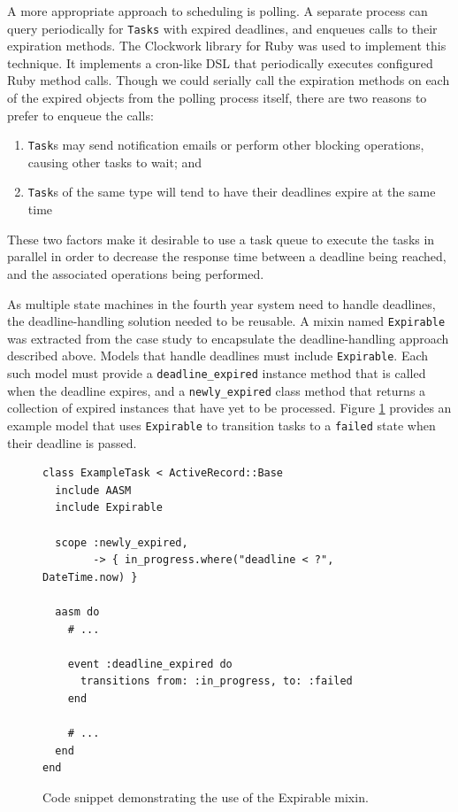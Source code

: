 \documentclass[document.tex]{subfiles}
\begin{document}
A more appropriate approach to scheduling is polling. A separate process can query periodically for \verb!Tasks! with expired deadlines, and enqueues calls to their expiration methods. The Clockwork \cite{clockwork} library for Ruby was used to implement this technique. It implements a cron-like DSL that periodically executes configured Ruby method calls. Though we could serially call the expiration methods on each of the expired objects from the polling process itself, there are two reasons to prefer to enqueue the calls:
\begin{enumerate}
\item \verb!Task!s may send notification emails or perform other blocking operations, causing other tasks to wait; and
\item \verb!Task!s of the same type will tend to have their deadlines expire at the same time
\end{enumerate}
These two factors make it desirable to use a task queue to execute the tasks in parallel in order to decrease the response time between a deadline being reached, and the associated operations being performed.

As multiple state machines in the fourth year system need to handle deadlines, the deadline-handling solution needed to be reusable. A mixin named \verb!Expirable! was extracted from the case study to encapsulate the deadline-handling approach described above. Models that handle deadlines must include \verb!Expirable!. Each such model must provide a \verb!deadline_expired! instance method that is called when the deadline expires, and a \verb!newly_expired! class method that returns a collection of expired instances that have yet to be processed. Figure \ref{fig:deadline-expiration-example} provides an example model that uses \verb!Expirable! to transition tasks to a \verb!failed! state when their deadline is passed.

\begin{figure}[!ht]
  \begin{lstlisting}
class ExampleTask < ActiveRecord::Base
  include AASM
  include Expirable

  scope :newly_expired,
        -> { in_progress.where("deadline < ?", DateTime.now) }

  aasm do
    # ...

    event :deadline_expired do
      transitions from: :in_progress, to: :failed
    end

    # ...
  end
end
  \end{lstlisting}
  \caption{Code snippet demonstrating the use of the Expirable mixin.}
  \label{fig:deadline-expiration-example}
\end{figure}
\end{document}
